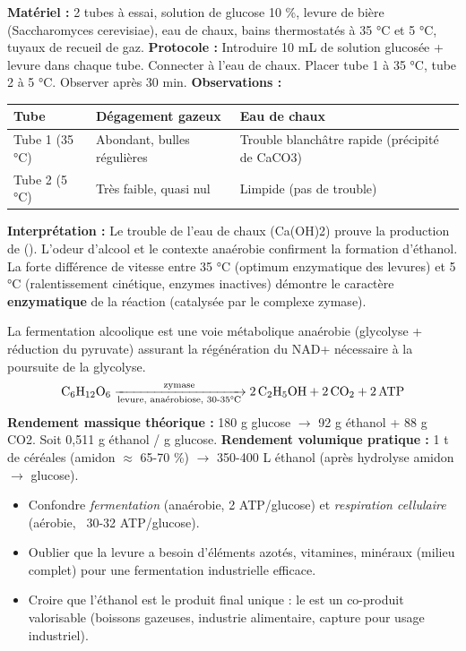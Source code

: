 \documentclass[11pt]{article}
\newcommand{\cle}[1]{{\popxbold\color{popdark}#1}}
\begin{document}
\begin{experience}
\textbf{Matériel :} 2 tubes à essai, solution de glucose 10 \%, levure de bière (Saccharomyces cerevisiae), eau de chaux, bains thermostatés à 35 °C et 5 °C, tuyaux de recueil de gaz.
\textbf{Protocole :} Introduire 10 mL de solution glucosée + levure dans chaque tube. Connecter à l'eau de chaux. Placer tube 1 à 35 °C, tube 2 à 5 °C. Observer après 30 min.
\textbf{Observations :}
\begin{center}
\begin{tabularx}{\linewidth}{|l|X|X|}\hline
\rowcolor{popblueL} \textbf{Tube} & \textbf{Dégagement gazeux} & \textbf{Eau de chaux} \\ \hline
Tube 1 (35 °C) & Abondant, bulles régulières & Trouble blanchâtre rapide (précipité de CaCO3) \\ \hline
Tube 2 (5 °C) & Très faible, quasi nul & Limpide (pas de trouble) \\ \hline
\end{tabularx}
\end{center}
\textbf{Interprétation :} Le trouble de l'eau de chaux (Ca(OH)2) prouve la production de  (). L'odeur d'alcool et le contexte anaérobie confirment la formation d'éthanol. La forte différence de vitesse entre 35 °C (optimum enzymatique des levures) et 5 °C (ralentissement cinétique, enzymes inactives) démontre le caractère \textbf{enzymatique} de la réaction (catalysée par le complexe \cle{zymase}).
\end{experience}

\begin{propriete}
La fermentation alcoolique est une voie métabolique anaérobie (glycolyse + réduction du pyruvate) assurant la régénération du \cle{NAD+} nécessaire à la poursuite de la glycolyse.
\[ \ce{C6H12O6 ->[zymase][\text{levure, anaérobiose, 30-35°C}] 2 C2H5OH + 2 CO2 + 2 ATP} \]
\textbf{Rendement massique théorique :} 180 g glucose $\rightarrow$ 92 g éthanol + 88 g CO2. Soit 0,511 g éthanol / g glucose.
\textbf{Rendement volumique pratique :} 1 t de céréales (amidon $\approx$ 65-70 \%) $\rightarrow$ 350-400 L éthanol (après hydrolyse amidon $\rightarrow$ glucose).
\end{propriete}

\begin{attention}
\begin{itemize}
\item Confondre \emph{fermentation} (anaérobie, 2 ATP/glucose) et \emph{respiration cellulaire} (aérobie, ~30-32 ATP/glucose).
\item Oublier que la levure a besoin d'éléments azotés, vitamines, minéraux (milieu complet) pour une fermentation industrielle efficace.
\item Croire que l'éthanol est le produit final unique : le  est un co-produit valorisable (boissons gazeuses, industrie alimentaire, capture pour usage industriel).
\end{itemize}
\end{attention}
\end{document}
